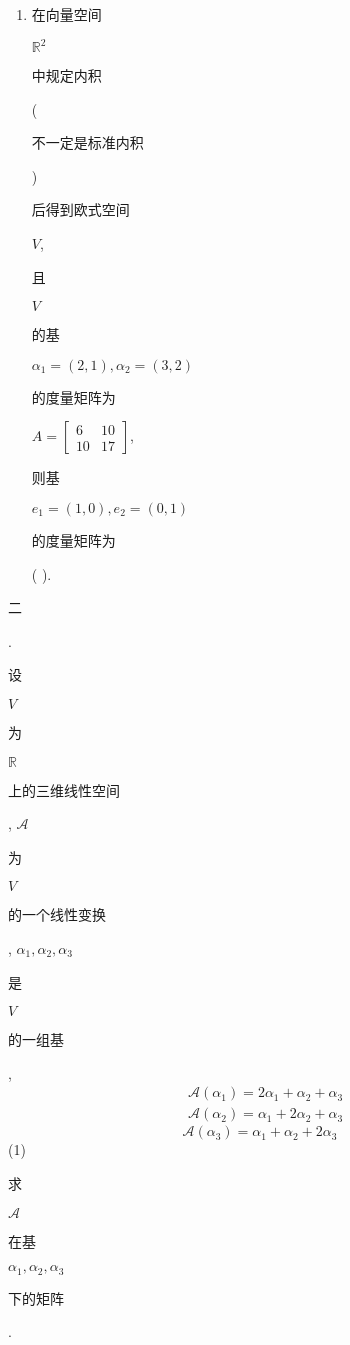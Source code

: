 \documentclass[10pt]{article}
\begin{document}
\begin{enumerate}
  \item \begin{CJK}{UTF8}{mj}在向量空间\end{CJK} $\mathbb{R}^{2}$ \begin{CJK}{UTF8}{mj}中规定内积\end{CJK} (\begin{CJK}{UTF8}{mj}不一定是标准内积\end{CJK}) \begin{CJK}{UTF8}{mj}后得到欧式空间\end{CJK} $V$, \begin{CJK}{UTF8}{mj}且\end{CJK} $V$ \begin{CJK}{UTF8}{mj}的基\end{CJK} $\alpha_{1}=(2,1), \alpha_{2}=(3,2)$ \begin{CJK}{UTF8}{mj}的度量矩阵为\end{CJK} $A=\left[\begin{array}{cc}6 & 10 \\ 10 & 17\end{array}\right]$, \begin{CJK}{UTF8}{mj}则基\end{CJK} $e_{1}=(1,0), e_{2}=(0,1)$ \begin{CJK}{UTF8}{mj}的度量矩阵为\end{CJK} ( ).

\end{enumerate}
\begin{CJK}{UTF8}{mj}二\end{CJK}. \begin{CJK}{UTF8}{mj}设\end{CJK} $V$ \begin{CJK}{UTF8}{mj}为\end{CJK} $\mathbb{R}$ \begin{CJK}{UTF8}{mj}上的三维线性空间\end{CJK}, $\mathscr{A}$ \begin{CJK}{UTF8}{mj}为\end{CJK} $V$ \begin{CJK}{UTF8}{mj}的一个线性变换\end{CJK}, $\alpha_{1}, \alpha_{2}, \alpha_{3}$ \begin{CJK}{UTF8}{mj}是\end{CJK} $V$ \begin{CJK}{UTF8}{mj}的一组基\end{CJK},
$$
\begin{aligned}
&\mathscr{A}\left(\alpha_{1}\right)=2 \alpha_{1}+\alpha_{2}+\alpha_{3} \\
&\mathscr{A}\left(\alpha_{2}\right)=\alpha_{1}+2 \alpha_{2}+\alpha_{3}
\end{aligned}
$$
$$
\mathscr{A}\left(\alpha_{3}\right)=\alpha_{1}+\alpha_{2}+2 \alpha_{3}
$$
(1) \begin{CJK}{UTF8}{mj}求\end{CJK} $\mathscr{A}$ \begin{CJK}{UTF8}{mj}在基\end{CJK} $\alpha_{1}, \alpha_{2}, \alpha_{3}$ \begin{CJK}{UTF8}{mj}下的矩阵\end{CJK}.
\end{document}
